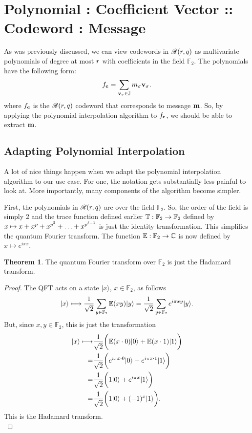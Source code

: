 \documentclass[12pt,twoside]{reedthesis}
\theoremstyle{definition}
\newtheorem{theorem}{Theorem}[chapter]
\newlength{\arrow}
\newcommand{\C}{\mathbb{C}}
\newcommand{\F}{\mathbb{F}}
\newcommand{\ket}[1]{\ensuremath{\lvert #1\rangle}\xspace}
\begin{document}
\section{Polynomial : Coefficient Vector :: Codeword : Message}
As was previously discussed, we can view codewords in $\mathscr{R}(r, q)$ as multivariate polynomials of degree at most $r$ with coefficients in the field $\F_2$. The polynomials have the following form:
\begin{equation}
f_\mathbf{c} = \sum_{\mathbf{v}_{\sigma} \in \mathbb{J}} m_{\sigma} \mathbf{v}_{\sigma} .
\end{equation}
where $f_\mathbf{c}$ is the $\mathscr{R}(r,q)$ codeword that corresponds to message $\mathbf{m}$. So, by applying the polynomial interpolation algorithm to $f_\mathbf{c}$, we should be able to extract $\mathbf{m}$. 


\subsection{Adapting Polynomial Interpolation}
A lot of nice things happen when we adapt the polynomial interpolation algorithm to our use case. For one, the notation gets substantially less painful to look at. More importantly, many components of the algorithm become simpler.

First, the polynomials in $\mathscr{R}(r,q)$ are over the field $\F_2$. So, the order of the field is simply 2 and the trace function defined earlier $\tracef:\F_2 \rightarrow \F_2$ defined by $x \mapsto x + x^p + x^{p^2} + \ldots + x^{p^{\ell-1}}$ is just the identity transformation. This simplifies the quantum Fourier transform. The function $\expf: \F_2 \rightarrow \C$ is now defined by $x \longmapsto e^{i\pi x}$.

 
\begin{theorem} The quantum Fourier transform over $\F_2$ is just the Hadamard transform.
\end{theorem}

\begin{proof}
The QFT acts on a state $\ket{x}$, $x\in \F_2$, as follows
\begin{equation*}
\ket{x}  \longmapsto \frac{1}{\sqrt{2}}\sum_{y\in \F_2} \expf(xy)\ket{y}
=  \frac{1}{\sqrt{2}}\sum_{y\in \F_2} e^{i\pi xy}\ket{y}.
\end{equation*}
But, since $x,y \in \F_2$, this is just the transformation
\begin{align*}
\ket{x}  \longmapsto 
&\frac{1}{\sqrt{2}}\bigg( \expf(x\cdot 0)\ket{0} + \expf(x\cdot 1)\ket{1} \bigg) \\
 = &  \frac{1}{\sqrt{2}}\bigg( e^{i\pi x\cdot 0}\ket{0} + e^{i\pi x\cdot 1}\ket{1} \bigg) \\
 = & \frac{1}{\sqrt{2}}\bigg( 1\ket{0} + e^{i\pi x}\ket{1} \bigg) \\
 = & \frac{1}{\sqrt{2}}\bigg( 1\ket{0} + (-1)^x\ket{1} \bigg). 
\end{align*}
This is the Hadamard transform. \\
\end{proof}
\end{document}
